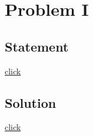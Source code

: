 \section{Problem I}
    \subsection{Statement}
        {\color{blue} \href{http://codeforces.com/problemset/problem/520/C}{click}}

    \subsection{Solution}
        {\color{blue} \href{http://codeforces.com/blog/entry/16736}{click}}
